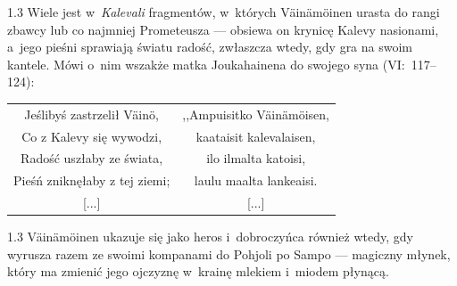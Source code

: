 \documentclass[11pt,a4paper,twoside]{report}
\begin{document}
\begin{spacing}{1.3}
Wiele jest w~\emph{Kalevali} fragmentów, w~których Väinämöinen urasta do rangi zbawcy lub co najmniej Prometeusza --- obsiewa on krynicę Kalevy nasionami, a~jego pieśni sprawiają światu radość, zwłaszcza wtedy, gdy gra na swoim kantele. Mówi o~nim wszakże matka Joukahainena do swojego syna (VI:~117--124):
\end{spacing}
{\centering
\small
\begin{longtable}{c c}
Jeślibyś zastrzelił Väinö, & ,,Ampuisitko Väinämöisen, \\
Co z Kalevy się wywodzi, & kaataisit kalevalaisen, \\
Radość uszłaby ze świata, & ilo ilmalta katoisi, \\
Pieśń zniknęłaby z tej ziemi; & laulu maalta lankeaisi. \\
{[...]} & {[...]}\\
\end{longtable}
}
\begin{spacing}{1.3}
Väinämöinen ukazuje się jako heros i~dobroczyńca również wtedy, gdy wyrusza razem ze swoimi kompanami do Pohjoli po Sampo --- magiczny młynek, który ma zmienić jego ojczyznę w~krainę mlekiem i~miodem płynącą.
\end{spacing}
\vspace*{0.5\baselineskip}
\end{document}
